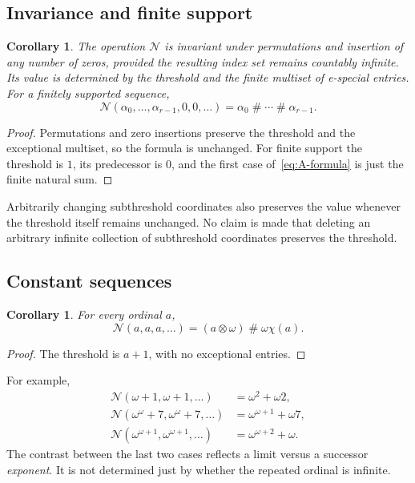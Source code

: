 \documentclass[11pt,letterpaper]{article}
\newtheorem{corollary}[theorem]{Corollary}
\theoremstyle{definition}
\theoremstyle{remark}
\newcommand{\Nop}{\mathcal N}
\newcommand{\ns}{\mathbin{\#}}
\newcommand{\np}{\mathbin{\otimes}}
\newcommand{\chip}{\chi}
\begin{document}
\subsection{Invariance and finite support}

\begin{corollary}\label{cor:invariance}
The operation $\Nop$ is invariant under permutations and insertion of any number of zeros, provided the resulting index set remains countably infinite. Its value is determined by the threshold and the finite multiset of e-special entries. For a finitely supported sequence,
\[
 \Nop(\alpha_0,\ldots,\alpha_{r-1},0,0,\ldots)
   =\alpha_0\ns\cdots\ns\alpha_{r-1}.
\]
\end{corollary}
\begin{proof}
Permutations and zero insertions preserve the threshold and the exceptional multiset, so the formula is unchanged. For finite support the threshold is $1$, its predecessor is $0$, and the first case of~\eqref{eq:A-formula} is just the finite natural sum.
\end{proof}

Arbitrarily changing subthreshold coordinates also preserves the value whenever the threshold itself remains unchanged. No claim is made that deleting an arbitrary infinite collection of subthreshold coordinates preserves the threshold.

\subsection{Constant sequences}

\begin{corollary}\label{cor:constant}
For every ordinal $a$,
\begin{equation}\label{eq:constant}
 \Nop(a,a,a,\ldots)=(a\np\omega)\ns\omega\chip(a).
\end{equation}
\end{corollary}
\begin{proof}
The threshold is $a+1$, with no exceptional entries.
\end{proof}

For example,
\begin{align*}
 \Nop(\omega+1,\omega+1,\ldots)&=\omega^2+\omega2,\\
 \Nop(\omega^\omega+7,\omega^\omega+7,\ldots)
       &=\omega^{\omega+1}+\omega7,\\
 \Nop(\omega^{\omega+1},\omega^{\omega+1},\ldots)
       &=\omega^{\omega+2}+\omega.
\end{align*}
The contrast between the last two cases reflects a limit versus a successor \emph{exponent}. It is not determined just by whether the repeated ordinal is infinite.
\end{document}
